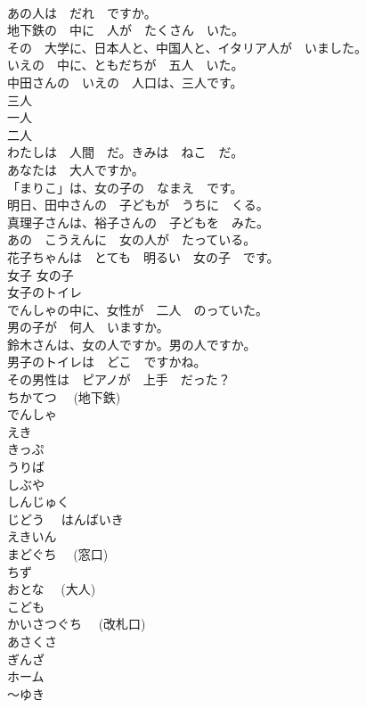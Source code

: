 \documentclass[8pt]{extreport}
\begin{document}
\begin{CJK}{UTF8}{min}
\\	あの人は　だれ　ですか。	
\\	地下鉄の　中に　人が　たくさん　いた。	
\\	その　大学に、日本人と、中国人と、イタリア人が　いました。	
\\	いえの　中に、ともだちが　五人　いた。	
\\	中田さんの　いえの　人口は、三人です。	
\\	三人	
\\	一人	
\\	二人	
\\	わたしは　人間　だ。きみは　ねこ　だ。	
\\	あなたは　大人ですか。	
\\	「まりこ」は、女の子の　なまえ　です。	
\\	明日、田中さんの　子どもが　うちに　くる。	
\\	真理子さんは、裕子さんの　子どもを　みた。	
\\	あの　こうえんに　女の人が　たっている。	
\\	花子ちゃんは　とても　明るい　女の子　です。	
\\	女子 女の子	
\\	女子のトイレ	
\\	でんしゃの中に、女性が　二人　のっていた。	
\\	男の子が　何人　いますか。	
\\	鈴木さんは、女の人ですか。男の人ですか。	
\\	男子のトイレは　どこ　ですかね。	
\\	その男性は　ピアノが　上手　だった？	
\\	ちかてつ　 (地下鉄)	
\\	でんしゃ	
\\	えき	
\\	きっぷ	
\\	うりば	
\\	しぶや	
\\	しんじゅく	
\\	じどう　 はんばいき	
\\	えきいん	
\\	まどぐち　 (窓口)	
\\	ちず	
\\	おとな　 (大人)	
\\	こども	
\\	かいさつぐち　 (改札口)	
\\	あさくさ	
\\	ぎんざ	
\\	ホーム	
\\	～ゆき	

\end{CJK}
\end{document}
